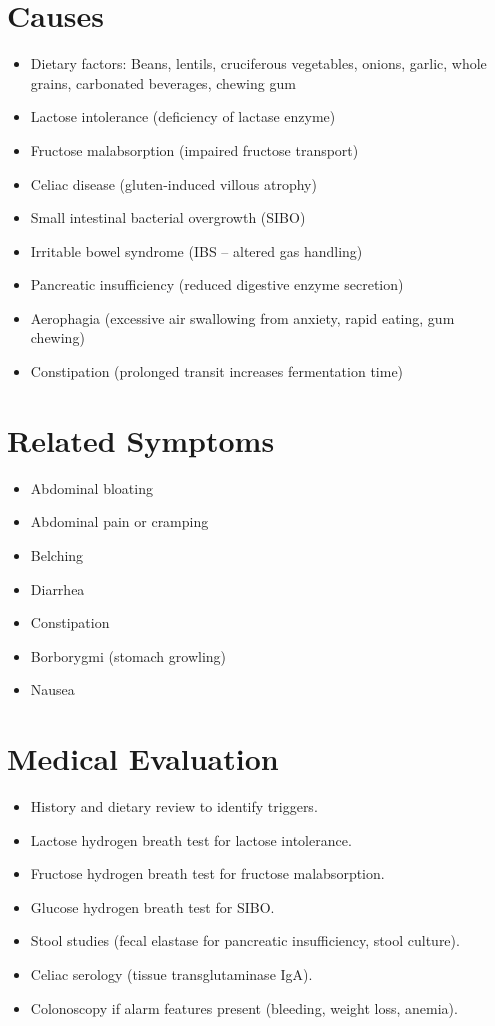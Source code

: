 \section*{Causes}
\begin{itemize}
  \item Dietary factors: Beans, lentils, cruciferous vegetables, onions, garlic, whole grains, carbonated beverages, chewing gum
  \item Lactose intolerance (deficiency of lactase enzyme)
  \item Fructose malabsorption (impaired fructose transport)
  \item Celiac disease (gluten-induced villous atrophy)
  \item Small intestinal bacterial overgrowth (SIBO)
  \item Irritable bowel syndrome (IBS -- altered gas handling)
  \item Pancreatic insufficiency (reduced digestive enzyme secretion)
  \item Aerophagia (excessive air swallowing from anxiety, rapid eating, gum chewing)
  \item Constipation (prolonged transit increases fermentation time)
\end{itemize}

\section*{Related Symptoms}
\begin{itemize}
  \item Abdominal bloating
  \item Abdominal pain or cramping
  \item Belching
  \item Diarrhea
  \item Constipation
  \item Borborygmi (stomach growling)
  \item Nausea
\end{itemize}

\section*{Medical Evaluation}
\begin{itemize}
  \item History and dietary review to identify triggers.
  \item Lactose hydrogen breath test for lactose intolerance.
  \item Fructose hydrogen breath test for fructose malabsorption.
  \item Glucose hydrogen breath test for SIBO.
  \item Stool studies (fecal elastase for pancreatic insufficiency, stool culture).
  \item Celiac serology (tissue transglutaminase IgA).
  \item Colonoscopy if alarm features present (bleeding, weight loss, anemia).
\end{itemize}

